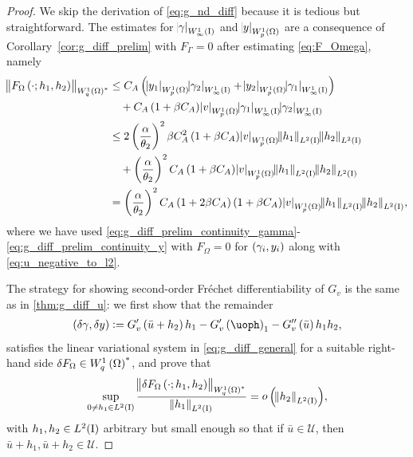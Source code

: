 \documentclass[final]{siamltex}
\begin{document}
\begin{proof}
We skip the derivation of \eqref{eq:g_nd_diff} because it is tedious but straightforward. The estimates for ${\abs{{\gamma}}_{{W^{{1}}_{{\infty}}\del{{\text{\rm I}}}}}}$ and ${\abs{{y}}_{{W^{{1}}_{{p}}\del{{\Omega}}}}}$ are a consequence of Corollary~\ref{cor:g_diff_prelim} with $F_\Gamma = 0$ after estimating \eqref{eq:F_Omega}, namely
	\begin{align*}
		{\norm{{F_\Omega\del{\cdot;h_1,h_2}}}_{{{W^{{1}}_{{q}}\del{{\Omega}}}}^*}}
			&\leq C_A\del{ {\abs{{y_1}}_{{W^{{1}}_{{p}}\del{{\Omega}}}}}{\abs{{\gamma_2}}_{{W^{{1}}_{{\infty}}\del{{\text{\rm I}}}}}}  
					+ {\abs{{y_2}}_{{W^{{1}}_{{p}}\del{{\Omega}}}}}{\abs{{\gamma_1}}_{{W^{{1}}_{{\infty}}\del{{\text{\rm I}}}}}}} \\
			&\quad + C_A\del{1+\beta C_A}{\abs{{v}}_{{W^{{1}}_{{p}}\del{{\Omega}}}}} 
					{\abs{{\gamma_1}}_{{W^{{1}}_{{\infty}}\del{{\text{\rm I}}}}}} {\abs{{\gamma_2}}_{{W^{{1}}_{{\infty}}\del{{\text{\rm I}}}}}} \\
			&\leq 2\del{\frac{\alpha}{\theta_2}}^2\beta C_A^2\del{1+\beta C_A}{\abs{{v}}_{{W^{{1}}_{{p}}\del{{\Omega}}}}}
				{\norm{{h_1}}_{{L^2\del{{{\text{\rm I}}}}}}}{\norm{{h_2}}_{{L^2\del{{{\text{\rm I}}}}}}} \\
			&\quad + \del{\frac{\alpha}{\theta_2}}^2C_A\del{1+\beta C_A}{\abs{{v}}_{{W^{{1}}_{{p}}\del{{\Omega}}}}} {\norm{{h_1}}_{{L^2\del{{{\text{\rm I}}}}}}}{\norm{{h_2}}_{{L^2\del{{{\text{\rm I}}}}}}} \\
			&= \del{\frac{\alpha}{\theta_2}}^2C_A\del{1+2\beta C_A}\del{1+\beta C_A}{\abs{{v}}_{{W^{{1}}_{{p}}\del{{\Omega}}}}} {\norm{{h_1}}_{{L^2\del{{{\text{\rm I}}}}}}}{\norm{{h_2}}_{{L^2\del{{{\text{\rm I}}}}}}},
	\end{align*}
where we have used \eqref{eq:g_diff_prelim_continuity_gamma}-\eqref{eq:g_diff_prelim_continuity_y} with $F_\Omega = 0$ for $\del{\gamma_i, y_i}$ along with \eqref{eq:u_negative_to_l2}.

	The strategy for showing second-order Fr\'echet differentiability of $G_v$ is the same as in \autoref{thm:g_diff_u}: we first  show that the remainder 
		\begin{align}  \label{eq:sec_ord_res}
			\del{\delta\gamma, \delta y} := G_v'\del{{\bar{u}} + h_2}h_1 - G_v'\del\uoph_1 -
								 G_v''\del{\bar{u}}{h_1h_2},
		\end{align} 
satisfies the linear variational system in \eqref{eq:g_diff_general} for a suitable right-hand side $\delta F_\Omega \in {{W^{1}_{q}\del{\Omega}}}^*$, and prove that 
	\begin{align}\label{eq:res_rhs_little_o}
		\sup_{0\neq h_1 \in L^2({\text{\rm I}})} \frac{{\norm{{\delta F_\Omega\del{\cdot;h_1,h_2}}}_{{{W^{{1}}_{{q}}\del{{\Omega}}}}^*}}}{{\norm{{h_1}}_{{L^2\del{{{\text{\rm I}}}}}}}} = {\mathop{o}\del{{{{\norm{{h_2}}_{{L^2\del{{{\text{\rm I}}}}}}}}}}} ,
	\end{align}
with $h_1, h_2 \in L^2({\text{\rm I}})$ arbitrary but small enough so that if 
${\bar{u}} \in {\mathcal{U}}$, then ${\bar{u}} + h_1, {\bar{u}} + h_2 \in {\mathcal{U}}$.
	

\end{proof}
\end{document}
